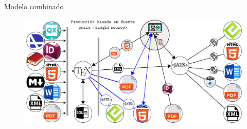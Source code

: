 \documentclass[14pt,aspectratio=169]{beamer}
\begin{document}

\begin{frame}{Modelo combinado}
	\begin{figure}
		\centering
		\includegraphics[width=.9\textwidth]{arbol3.pdf}
	\end{figure}
\end{frame}

%
\end{document}
